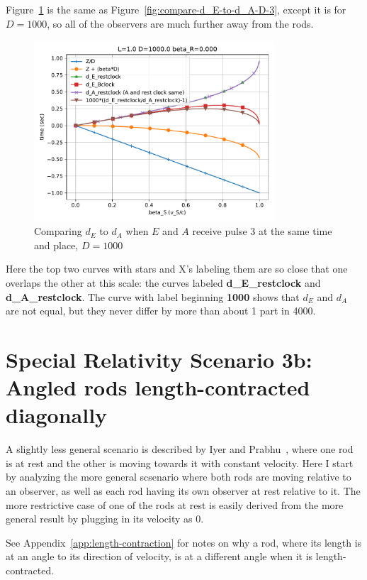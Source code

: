 \documentclass[a4paper]{article}
\theoremstyle{plain}
\theoremstyle{definition}
\begin{document}
Figure~\ref{fig:compare-d_E-to-d_A-D-1000} is the same as
Figure~\ref{fig:compare-d_E-to-d_A-D-3}, except it is for $D=1000$, so
all of the observers are much further away from the rods.
\begin{figure}[ht]
	\centering
	\includegraphics[width=0.8\textwidth]{scen2b-where-E-starts-to-receive-pulse-3-at-A-location-D-1000.0-beta_R-0.000.pdf}
	\caption{Comparing $d_E$ to $d_A$ when $E$ and $A$ receive pulse 3 at the same time and place, $D=1000$}
	\label{fig:compare-d_E-to-d_A-D-1000}
\end{figure}
Here the top two curves with stars and X's labeling them are so close
that one overlaps the other at this scale: the curves labeled
\textbf{d\_E\_restclock} and \textbf{d\_A\_restclock}.
The curve with label beginning \textbf{1000} shows that $d_E$ and
$d_A$ are not equal, but they never differ by more than about 1 part
in 4000.


\section{Special Relativity Scenario 3b: Angled rods length-contracted diagonally}
\label{sec:scen3b}

A slightly less general scenario is described by Iyer and
Prabhu~\cite{IP2006}, where one rod is at rest and the other is moving
towards it with constant velocity.  Here I start by analyzing the more
general scsenario where both rods are moving relative to an observer,
as well as each rod having its own observer at rest relative to it.
The more restrictive case of one of the rods at rest is easily derived
from the more general result by plugging in its velocity as 0.

See Appendix~\ref{app:length-contraction} for notes on why a rod,
where its length is at an angle to its direction of velocity, is at a
different angle when it is length-contracted.
\end{document}
